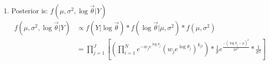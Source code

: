 \documentclass[paper=a4, fontsize=11pt]{scrartcl}
\newcommand{\parens}[1]{ \left( #1 \right) }
\begin{document}
  \begin{enumerate}[1]
    \item Posterior is: $f(\mu, \sigma^2, \log{\vec{\theta}} | Y)$
      \begin{align*}
        f(\mu, \sigma^2, \log{\vec{\theta}} | Y) &\propto f(Y|\log{\vec{\theta}}) * f(\log{\vec{\theta}}|\mu, \sigma^2) * f(\mu, \sigma^2) \\
        &= \prod_{j=1}^{J}{
          \left[ \parens{
            \prod_{i=1}^N{
              e^{-w_je^{\log{\theta_j}}}\parens{w_je^{\log{\theta_j}}}^{k_{ji}}
            }}
            * \frac{1}{\sigma}e^{
                                  \frac{-(\log{\theta_j}-\mu)^2}{2\sigma^2}
                                }
            * \frac{1}{\sigma^2}
          \right]
        }
      \end{align*}
  \end{enumerate}
\end{document}
